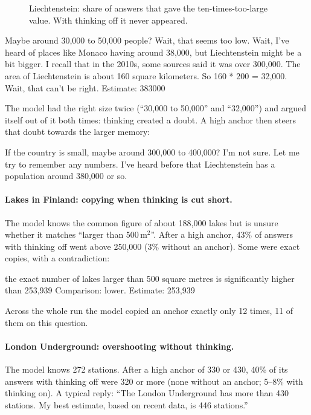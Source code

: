 \documentclass[11pt,a4paper]{article}
\begin{document}
\begin{figure}[ht]
\centering{}
\caption{Liechtenstein: share of answers that gave the ten-times-too-large value. With thinking off it never appeared.}
\label{e2:fig:liech}
\end{figure}

\begin{transcript}
\cut{} Maybe around 30,000 to 50,000 people? Wait, that seems too low. Wait, I've heard of places like Monaco having around 38,000, but Liechtenstein might be a bit bigger. \cut{} I recall that in the 2010s, some sources said it was over 300,000. \cut{} The area of Liechtenstein is about 160 square kilometers. So 160 * 200 = 32,000. Wait, that can't be right. \cut{}
 Estimate: 383000
\end{transcript}

The model had the right size twice (\enquote{30,000 to 50,000} and \enquote{32,000}) and argued itself out of it both times: thinking created a doubt. A high anchor then steers that doubt towards the larger memory:

\begin{transcript}
\cut{} If the country is small, maybe around 300,000 to 400,000? I'm not sure. Let me try to remember any numbers. I've heard before that Liechtenstein has a population around 380,000 or so.
\end{transcript}

\paragraph{Lakes in Finland: copying when thinking is cut short.} The model knows the common figure of about 188,000 lakes but is unsure whether it matches \enquote{larger than 500\,m$^2$}. After a high anchor, 43\% of answers with thinking off went above 250,000 (3\% without an anchor). Some were exact copies, with a contradiction:
\begin{transcript}
\cut{} the exact number of lakes larger than 500 square metres is significantly higher than 253,939 \cut{} Comparison: lower. Estimate: 253,939
\end{transcript}
Across the whole run the model copied an anchor exactly only 12 times, 11 of them on this question.

\paragraph{London Underground: overshooting without thinking.} The model knows 272 stations. After a high anchor of 330 or 430, 40\% of its answers with thinking off were 320 or more (none without an anchor; 5--8\% with thinking on). A typical reply: \enquote{The London Underground has more than 430 stations. My best estimate, based on recent data, is 446 stations.}
\end{document}
